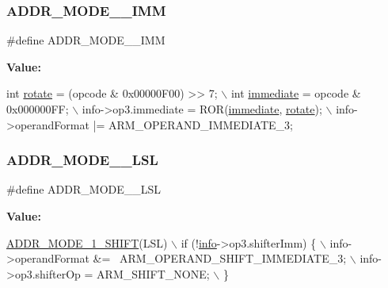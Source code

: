 \subsubsection{\texorpdfstring{A\+D\+D\+R\+\_\+\+M\+O\+D\+E\+\_\+\_\+\+I\+MM}{ADDR\_MODE\_1\_IMM}}
{\footnotesize\ttfamily \#define A\+D\+D\+R\+\_\+\+M\+O\+D\+E\+\_\+\_\+\+I\+MM}

{\bfseries Value\+:}
\begin{DoxyCode}
\textcolor{keywordtype}{int} \mbox{\hyperlink{decoder-arm_8c_a0b95db0f87fcbe71c3bbda1fa359606f}{rotate}} = (opcode & 0x00000F00) >> 7; \(\backslash\)
    int \mbox{\hyperlink{decoder-arm_8c_a8bc2501cb64b3bc9ac59754cfafb68d1}{immediate}} = opcode & 0x000000FF; \(\backslash\)
    info->op3.immediate = ROR(\mbox{\hyperlink{decoder-arm_8c_a8bc2501cb64b3bc9ac59754cfafb68d1}{immediate}}, \mbox{\hyperlink{decoder-arm_8c_a0b95db0f87fcbe71c3bbda1fa359606f}{rotate}}); \(\backslash\)
    info->operandFormat |= ARM\_OPERAND\_IMMEDIATE\_3;
\end{DoxyCode}
\mbox{\label{decoder-arm_8c_af7ffdff1f9a8ce3e5f5f534567ce62c7}} 
\subsubsection{\texorpdfstring{A\+D\+D\+R\+\_\+\+M\+O\+D\+E\+\_\+\_\+\+L\+SL}{ADDR\_MODE\_1\_LSL}}
{\footnotesize\ttfamily \#define A\+D\+D\+R\+\_\+\+M\+O\+D\+E\+\_\+\_\+\+L\+SL}

{\bfseries Value\+:}
\begin{DoxyCode}
\mbox{\hyperlink{decoder-arm_8c_a1aeb19b9eb90e4741cb384f6d6961224}{ADDR\_MODE\_1\_SHIFT}}(LSL) \(\backslash\)
    if (!\mbox{\hyperlink{libretro_8h_structretro__game__info}{info}}->op3.shifterImm) \{ \(\backslash\)
        info->operandFormat &= ~ARM\_OPERAND\_SHIFT\_IMMEDIATE\_3; \(\backslash\)
        info->op3.shifterOp = ARM\_SHIFT\_NONE; \(\backslash\)
    \}
\end{DoxyCode}
\mbox{\label{decoder-arm_8c_af7d17794392b03e822fe37dc28142356}} 

